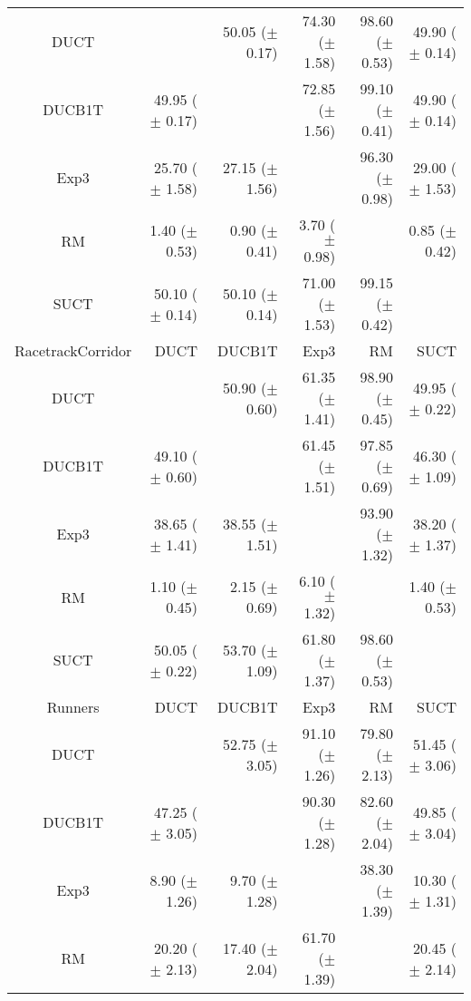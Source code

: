 \documentclass{article}
\begin{document}
\begin{table}
\begin{center}
\begin{tabular}{|c|rrrrr|}
\hline
           DUCT    &              & 50.05 ($\pm$ 0.17)   & 74.30 ($\pm$ 1.58)   & 98.60 ($\pm$ 0.53)   & 49.90 ($\pm$ 0.14)   \\
         DUCB1T    & 49.95 ($\pm$ 0.17)   &              & 72.85 ($\pm$ 1.56)   & 99.10 ($\pm$ 0.41)   & 49.90 ($\pm$ 0.14)   \\
           Exp3    & 25.70 ($\pm$ 1.58)   & 27.15 ($\pm$ 1.56)   &              & 96.30 ($\pm$ 0.98)   & 29.00 ($\pm$ 1.53)   \\
             RM    & 1.40 ($\pm$ 0.53)   & 0.90 ($\pm$ 0.41)   & 3.70 ($\pm$ 0.98)   &              & 0.85 ($\pm$ 0.42)   \\
           SUCT    & 50.10 ($\pm$ 0.14)   & 50.10 ($\pm$ 0.14)   & 71.00 ($\pm$ 1.53)   & 99.15 ($\pm$ 0.42)   &              \\
\hline
\hline
RacetrackCorridor   &       DUCT   &     DUCB1T   &       Exp3   &         RM   &       SUCT   \\
\hline
           DUCT    &              & 50.90 ($\pm$ 0.60)   & 61.35 ($\pm$ 1.41)   & 98.90 ($\pm$ 0.45)   & 49.95 ($\pm$ 0.22)   \\
         DUCB1T    & 49.10 ($\pm$ 0.60)   &              & 61.45 ($\pm$ 1.51)   & 97.85 ($\pm$ 0.69)   & 46.30 ($\pm$ 1.09)   \\
           Exp3    & 38.65 ($\pm$ 1.41)   & 38.55 ($\pm$ 1.51)   &              & 93.90 ($\pm$ 1.32)   & 38.20 ($\pm$ 1.37)   \\
             RM    & 1.10 ($\pm$ 0.45)   & 2.15 ($\pm$ 0.69)   & 6.10 ($\pm$ 1.32)   &              & 1.40 ($\pm$ 0.53)   \\
           SUCT    & 50.05 ($\pm$ 0.22)   & 53.70 ($\pm$ 1.09)   & 61.80 ($\pm$ 1.37)   & 98.60 ($\pm$ 0.53)   &              \\
\hline
\hline
        Runners   &       DUCT   &     DUCB1T   &       Exp3   &         RM   &       SUCT   \\
\hline
           DUCT    &              & 52.75 ($\pm$ 3.05)   & 91.10 ($\pm$ 1.26)   & 79.80 ($\pm$ 2.13)   & 51.45 ($\pm$ 3.06)   \\
         DUCB1T    & 47.25 ($\pm$ 3.05)   &              & 90.30 ($\pm$ 1.28)   & 82.60 ($\pm$ 2.04)   & 49.85 ($\pm$ 3.04)   \\
           Exp3    & 8.90 ($\pm$ 1.26)   & 9.70 ($\pm$ 1.28)   &              & 38.30 ($\pm$ 1.39)   & 10.30 ($\pm$ 1.31)   \\
             RM    & 20.20 ($\pm$ 2.13)   & 17.40 ($\pm$ 2.04)   & 61.70 ($\pm$ 1.39)   &              & 20.45 ($\pm$ 2.14)   \\

\end{tabular}
\end{center}
\end{table}
\end{document}
